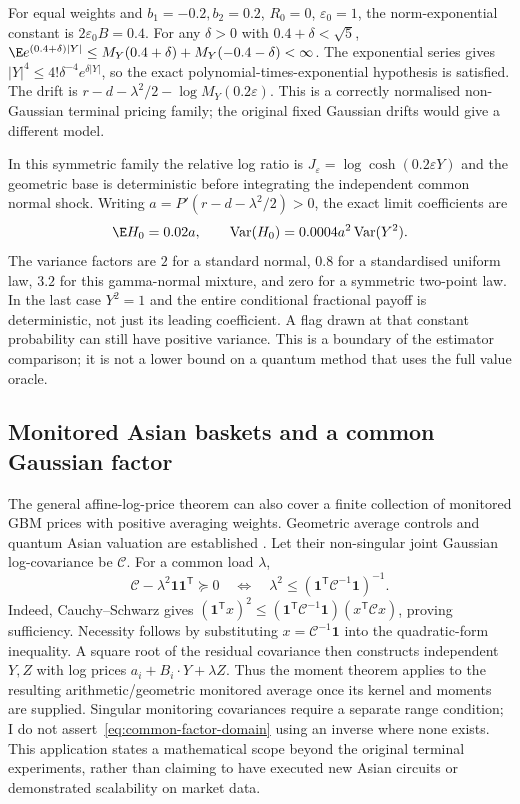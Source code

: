 For equal weights and $b_1=-0.2,b_2=0.2$, $R_0=0$,
$\varepsilon_0=1$, the norm-exponential constant is
$2\varepsilon_0B=0.4$. For any $\delta>0$ with
$0.4+\delta<\sqrt5$,
$\E e^{(0.4+\delta)|Y|}\leq
M_Y(0.4+\delta)+M_Y(-0.4-\delta)<\infty$.
The exponential series gives
$|Y|^4\leq4!\delta^{-4}e^{\delta|Y|}$, so the exact
polynomial-times-exponential hypothesis is satisfied.
The drift is $r-d-\lambda^2/2-\log M_Y(0.2\varepsilon)$.
This is a correctly normalised non-Gaussian terminal pricing family;
the original fixed Gaussian drifts would give a different model.

In this symmetric family the relative log ratio is
$J_\varepsilon=\log\cosh(0.2\varepsilon Y)$ and the geometric base
is deterministic before integrating the independent common normal shock.
Writing $a=P'(r-d-\lambda^2/2)>0$, the exact limit coefficients are
\begin{equation}
 \E H_0=0.02a,\qquad
 \operatorname{Var}(H_0)=0.0004a^2\operatorname{Var}(Y^2).
\end{equation}
The variance factors are $2$ for a standard normal, $0.8$ for a
standardised uniform law, $3.2$ for this gamma-normal mixture, and zero
for a symmetric two-point law. In the last case $Y^2=1$ and the
entire conditional fractional payoff is deterministic, not just its
leading coefficient. A flag drawn at that constant probability can still
have positive variance. This is a boundary of the estimator comparison;
it is not a lower bound on a quantum method that uses the full value oracle.

\subsection{Monitored Asian baskets and a common Gaussian factor}

The general affine-log-price theorem can also cover a finite collection
of monitored GBM prices with positive averaging weights. Geometric
average controls and quantum Asian valuation are established
\citep{kemna,rebentrost}. Let their non-singular joint Gaussian
log-covariance be $\mathcal C$. For a common load $\lambda$,
\begin{equation}\label{eq:common-factor-domain}
 \mathcal C-\lambda^2\mathbf1\mathbf1^{\mathsf T}\succeq0
 \quad\Longleftrightarrow\quad
 \lambda^2\leq(\mathbf1^{\mathsf T}\mathcal C^{-1}\mathbf1)^{-1}.
\end{equation}
Indeed, Cauchy--Schwarz gives
$(\mathbf1^{\mathsf T}x)^2\leq
(\mathbf1^{\mathsf T}\mathcal C^{-1}\mathbf1)(x^{\mathsf T}\mathcal Cx)$,
proving sufficiency. Necessity follows by substituting
$x=\mathcal C^{-1}\mathbf1$ into the quadratic-form inequality.
A square root of the residual covariance then constructs independent
$Y,Z$ with log prices $a_i+B_i\cdot Y+\lambda Z$.
Thus the moment theorem applies to the resulting arithmetic/geometric
monitored average once its kernel and moments are supplied.
Singular monitoring covariances require a separate range condition;
I do not assert~\eqref{eq:common-factor-domain} using an inverse where
none exists. This application states a mathematical scope beyond the
original terminal experiments, rather than claiming to have executed
new Asian circuits or demonstrated scalability on market data.
